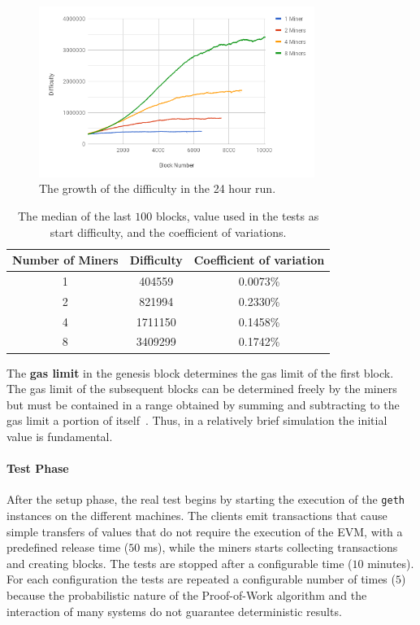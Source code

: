 \begin{figure}[h!]
  \begin{center}
    \includegraphics[width=0.8\textwidth]{./res/img/start_difficulty_all.png}
    \caption{The growth of the difficulty in the 24 hour run.}
    \label{fig:start_difficulty_raw}
  \end{center}
\end{figure}

\begin{table}[h!]
  \begin{center}
    \begin{tabular}{c | c | c}
      Number of Miners & Difficulty & Coefficient of variation \\
      \hline
      1 &  404559 & 0.0073\% \\
      2 &  821994 & 0.2330\%\\
      4 & 1711150 & 0.1458\%\\
      8 & 3409299 & 0.1742\%\\
    \end{tabular}
    \caption{The median of the last $100$ blocks, value used in the tests as
    start difficulty, and the coefficient of variations.}
    \label{table:start-difficulty}
  \end{center}
\end{table}

The \textbf{gas limit} in the genesis block determines the gas limit of the
first block. The gas limit of the subsequent blocks can be determined freely by
the miners but must be contained in a range obtained by summing and subtracting
to the gas limit a portion of itself~\cite{wood2018ethereum}. Thus, in a
relatively brief simulation the initial value is fundamental.


\paragraph{Test Phase}
After the setup phase, the real test begins by starting the execution of the
\texttt{geth} instances on the different machines. The clients emit transactions
that cause simple transfers of values that do not require the execution of
the EVM, with a predefined release time ($50$ ms), while the miners starts
collecting transactions and creating blocks. The tests are stopped after a
configurable time ($10$ minutes). For each configuration the tests are repeated
a configurable number of times ($5$) because the probabilistic nature of the
Proof-of-Work algorithm and the interaction of many systems do not guarantee
deterministic results.


